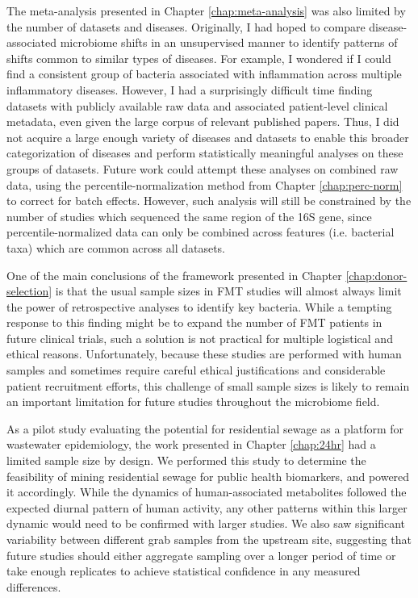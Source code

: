The meta-analysis presented in Chapter \ref{chap:meta-analysis} was also limited by the number of datasets and diseases.
Originally, I had hoped to compare disease-associated microbiome shifts in an unsupervised manner to identify patterns of shifts common to similar types of diseases.
For example, I wondered if I could find a consistent group of bacteria associated with inflammation across multiple inflammatory diseases.
However, I had a surprisingly difficult time finding datasets with publicly available raw data and associated patient-level clinical metadata, even given the large corpus of relevant published papers.
Thus, I did not acquire a large enough variety of diseases and datasets to enable this broader categorization of diseases and perform statistically meaningful analyses on these groups of datasets.
Future work could attempt these analyses on combined raw data, using the percentile-normalization method from Chapter \ref{chap:perc-norm} to correct for batch effects.
However, such analysis will still be constrained by the number of studies which sequenced the same region of the 16S gene, since percentile-normalized data can only be combined across features (i.e. bacterial taxa) which are common across all datasets.

One of the main conclusions of the framework presented in Chapter \ref{chap:donor-selection} is that the usual sample sizes in FMT studies will almost always limit the power of retrospective analyses to identify key bacteria.
While a tempting response to this finding might be to expand the number of FMT patients in future clinical trials, such a solution is not practical for multiple logistical and ethical reasons.
Unfortunately, because these studies are performed with human samples and sometimes require careful ethical justifications and considerable patient recruitment efforts, this challenge of small sample sizes is likely to remain an important limitation for future studies throughout the microbiome field.

As a pilot study evaluating the potential for residential sewage as a platform for wastewater epidemiology, the work presented in Chapter \ref{chap:24hr} had a limited sample size by design.
We performed this study to determine the feasibility of mining residential sewage for public health biomarkers, and powered it accordingly.
While the dynamics of human-associated metabolites followed the expected diurnal pattern of human activity, any other patterns within this larger dynamic would need to be confirmed with larger studies.
We also saw significant variability between different grab samples from the upstream site, suggesting that future studies should either aggregate sampling over a longer period of time or take enough replicates to achieve statistical confidence in any measured differences.

